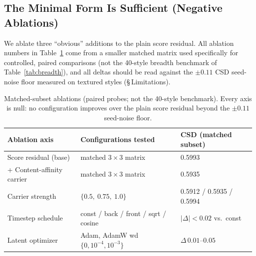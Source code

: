 \documentclass[letterpaper]{article} %
\begin{document}
\subsection{The Minimal Form Is Sufficient (Negative Ablations)}

We ablate three ``obvious'' additions to the plain score residual. All
ablation numbers in Table~\ref{tab:ablation} come from a smaller matched
matrix used specifically for controlled, paired comparisons (not the 40-style
breadth benchmark of Table~\ref{tab:breadth}), and all deltas should be read
against the $\pm0.11$ CSD seed-noise floor measured on textured styles
(\S\,Limitations).

\begin{table}[t]
\centering
\caption{Matched-subset ablations (paired probes; not the 40-style
benchmark). Every axis is null: no configuration improves over the plain
score residual beyond the $\pm0.11$ seed-noise floor.}
\label{tab:ablation}
\small
\setlength{\tabcolsep}{6pt}
\begin{tabular}{lll}
\toprule
Ablation axis & Configurations tested & CSD (matched subset) \\
\midrule
Score residual (base) & matched $3\times3$ matrix & 0.5993 \\
+ Content-affinity carrier & matched $3\times3$ matrix & 0.5935 \\
Carrier strength & $\{0.5,\ 0.75,\ 1.0\}$ & 0.5912 / 0.5935 / 0.5994 \\
Timestep schedule & const / back / front / sqrt / cosine & $|\Delta|<0.02$ vs.\ const \\
Latent optimizer & Adam, AdamW wd $\{0,10^{-4},10^{-3}\}$ & $\Delta\,0.01$--$0.05$ \\
\bottomrule
\end{tabular}
\end{table}
\end{document}
